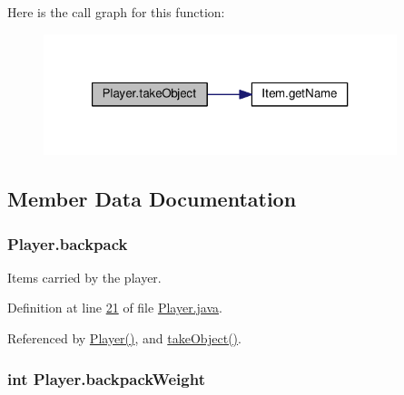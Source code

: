 Here is the call graph for this function\-:
\nopagebreak
\begin{figure}[H]
\begin{center}
\leavevmode
\includegraphics[width=292pt]{classPlayer_a256305370cf457a32791d68c73e0b236_cgraph}
\end{center}
\end{figure}




\subsection{Member Data Documentation}
\hypertarget{classPlayer_a33955abef833055b380ec4e9e6ac2e6e}{
\subsubsection[{backpack}]{ Player.\-backpack\hspace{0.3cm}{\ttfamily [private]}}}\label{classPlayer_a33955abef833055b380ec4e9e6ac2e6e}


Items carried by the player. 



Definition at line \hyperlink{Player_8java_source_l00021}{21} of file \hyperlink{Player_8java_source}{Player.\-java}.



Referenced by \hyperlink{Player_8java_source_l00053}{Player()}, and \hyperlink{Player_8java_source_l00186}{take\-Object()}.

\hypertarget{classPlayer_a54523ae912bf972491ace05d3bbcdc79}{
\subsubsection[{backpack\-Weight}]{\setlength{\rightskip}{0pt plus 5cm}int Player.\-backpack\-Weight\hspace{0.3cm}{\ttfamily [private]}}}\label{classPlayer_a54523ae912bf972491ace05d3bbcdc79}



